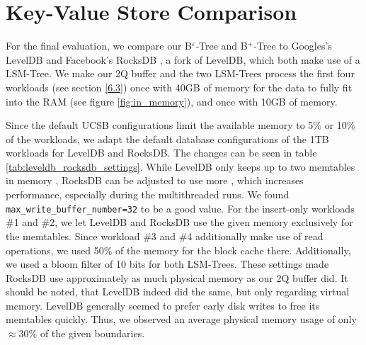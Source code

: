 \section{Key-Value Store Comparison}\label{6.4}

For the final evaluation, we compare our B$^\varepsilon$-Tree and B$^+$-Tree to Googles's LevelDB \cite{leveldb} and Facebook's RocksDB \cite{rocksdb}, a fork of LevelDB, which both make use of a LSM-Tree. We make our 2Q buffer and the two LSM-Trees process the first four workloads (see section \ref{6.3}) once with 40GB of memory for the data to fully fit into the RAM (see figure \ref{fig:in_memory}), and once with 10GB of memory.

Since the default UCSB configurations limit the available memory to 5\% or 10\% of the workloads, we adapt the default database configurations of the 1TB workloads for LevelDB and RocksDB. The changes can be seen in table \ref{tab:leveldb_rocksdb_settings}. While LevelDB only keeps up to two memtables in memory \cite{leveldb}, RocksDB can be adjusted to use more \cite{rocksdb}, which increases performance, especially during the multithreaded runs. We found \texttt{max\_write\_buffer\_number=32} to be a good value. For the insert-only workloads \#1 and \#2, we let LevelDB and RocksDB use the given memory exclusively for the memtables. Since workload \#3 and \#4 additionally make use of read operations, we used 50\% of the memory for the block cache there.\newline
Additionally, we used a bloom filter of 10 bits for both LSM-Trees. These settings made RocksDB use approximately as much physical memory as our 2Q buffer did. It should be noted, that LevelDB indeed did the same, but only regarding virtual memory. LevelDB generally seemed to prefer early disk writes to free its memtables quickly. Thus, we observed an average physical memory usage of only $\approx 30\%$ of the given boundaries.

